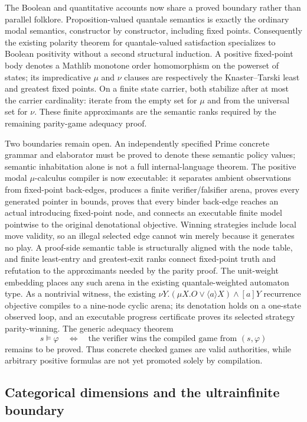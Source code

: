 \documentclass[11pt]{article}
\begin{document}
The Boolean and quantitative accounts now share a proved boundary rather than
parallel folklore.  Proposition-valued quantale semantics is exactly the
ordinary modal semantics, constructor by constructor, including fixed points.
Consequently the existing polarity theorem for quantale-valued satisfaction
specializes to Boolean positivity without a second structural induction.  A
positive fixed-point body denotes a Mathlib monotone order homomorphism on the
powerset of states; its impredicative $\mu$ and $\nu$ clauses are respectively
the Knaster--Tarski least and greatest fixed points.  On a finite state carrier,
both stabilize after at most the carrier cardinality: iterate from the empty set
for $\mu$ and from the universal set for $\nu$.  These finite approximants are
the semantic ranks required by the remaining parity-game adequacy proof.

Two boundaries remain open.  An independently specified Prime concrete grammar
and elaborator must be proved to denote these semantic policy values; semantic
inhabitation alone is not a full internal-language theorem.  The positive
modal $\mu$-calculus compiler is now executable: it separates ambient
observations from fixed-point back-edges, produces a finite verifier/falsifier
arena, proves every generated pointer in bounds, proves that every binder
back-edge reaches an actual introducing fixed-point node, and connects an
executable finite model pointwise to the original denotational objective.
Winning strategies include local move validity, so an illegal selected edge
cannot win merely because it generates no play.  A proof-side semantic table is
structurally aligned with the node table, and finite least-entry and
greatest-exit ranks connect fixed-point truth and refutation to the approximants
needed by the parity proof.  The unit-weight
embedding places any such arena in the existing quantale-weighted automaton
type.  As a nontrivial witness, the existing
$\nu Y.(\mu X.O\lor\langle a\rangle X)\land[a]Y$ recurrence objective compiles
to a nine-node cyclic arena; its denotation holds on a one-state observed loop,
and an executable progress certificate proves its selected strategy
parity-winning.  The generic adequacy theorem
\[
  s\models\varphi
  \quad\Longleftrightarrow\quad
  \text{the verifier wins the compiled game from }(s,\varphi)
\]
remains to be proved.  Thus concrete checked games are valid authorities, while
arbitrary positive formulas are not yet promoted solely by compilation.

\subsection{Categorical dimensions and the ultrainfinite boundary}
\end{document}
